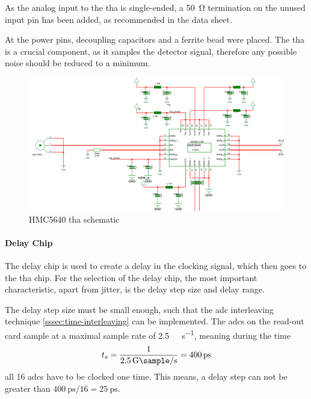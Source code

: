 As the analog input to the \gls{tha} is single-ended, a \SI{50}{\ohm} termination on the unused input pin has been added, as recommended in the data sheet.\cite{hmc5640}

At the power pins, decoupling capacitors and a ferrite bead  were placed. The \gls{tha} is a crucial component, as it samples the detector signal, therefore any possible noise should be reduced to a minimum.

\begin{figure}[tbh]
	\centering
	\includegraphics[width = \textwidth]{chap/04-work/img/hmc5640}
	\caption[HMC5640 THA Schematic]{HMC5640 \gls{tha} schematic}
	\label{fig:hmc5640}
\end{figure}


\paragraph{Delay Chip}
The delay chip is used to create a delay in the clocking signal, which then goes to the \gls{tha} chip. For the selection of the delay chip, the most important characteristic, apart from jitter, is the delay step size and delay range. 

The delay step size must be small enough, such that the \gls{adc} interleaving technique \autoref{sssec:time-interleaving} can be implemented. The \glspl{adc} on the read-out card sample at a maximal sample rate of \SI{2.5}{\giga \sample \per \second}, meaning during the time
\begin{equation}
	t_s = \frac{1}{\SI{2.5}{\giga \sample \per \second}} = \SI{400}{\pico \second}
\end{equation}
all 16 \glspl{adc} have to be clocked one time. This means, a delay step can not be greater than $\SI{400}{\pico \second}/16 = \SI{25}{\pico \second}$.

